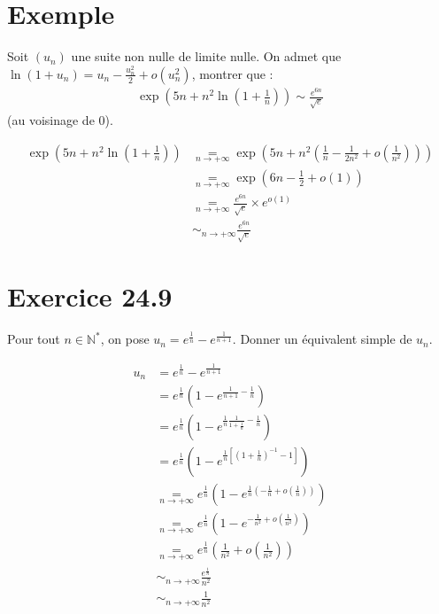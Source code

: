 \documentclass[../main.tex]{subfiles}
\begin{document}
\section{Exemple}
\begin{tcolorbox}[title=Exemple 24.46, title filled=false, colframe=darkgreen, colback=darkgreen!10!white]
    Soit $(u_n)$ une suite non nulle de limite nulle. On admet que $\ln (1 + u_n) = u_n - \frac{u_n^2}{2} + o(u_n^2)$, montrer que : 
    \begin{align*}
        \exp \left(5n + n^2\ln \left(1 + \frac{1}{n}\right)\right) \sim \frac{e^{6n}}{\sqrt{e}}
    \end{align*}
    (au voisinage de $0$).
\end{tcolorbox}

\begin{align*}
    \exp \left(5n + n^2 \ln \left(1 + \frac{1}{n}\right)\right) &\underset{n\to +\infty}{=} \exp \left(5n + n^2 \left(\frac{1}{n} - \frac{1}{2n^2} + o\left(\frac{1}{n^2}\right)\right)\right) \\
    &\underset{n\to +\infty}{=} \exp \left(6n - \frac{1}{2} + o(1)\right) \\
    &\underset{n\to +\infty}{=} \frac{e^{6n}}{\sqrt{e}} \times e^{o(1)} \\
    &\sim_{n\to +\infty} \frac{e^{6n}}{\sqrt{e}}
\end{align*}

\section*{Exercice 24.9}
\begin{tcolorbox}[title=Exercice 24.9, title filled=false, colframe=darkgreen, colback=darkgreen!10!white]
    Pour tout $n\in \mathbb{N}^*$, on pose $u_n = e^{\frac{1}{n}} - e^{\frac{1}{n+1}}$. Donner un équivalent simple de $u_n$. 
\end{tcolorbox}

\begin{align*}
    u_n &= e^{\frac{1}{n}} - e^{\frac{1}{n+1}} \\
    &= e^{\frac{1}{n}} (1 - e^{\frac{1}{n+1} -\frac{1}{n}}) \\
    &= e^{\frac{1}{n}} (1 - e^{\frac{1}{n} \frac{1}{1 + \frac{1}{n}} - \frac{1}{n}}) \\
    &= e^{\frac{1}{n}} (1 - e^{\frac{1}{n}\left[ (1 + \frac{1}{n})^{-1} - 1 \right]}) \\
    &\underset{n\to +\infty}{=} e^{\frac{1}{n}} (1 - e^{\frac{1}{n} \left(-\frac{1}{n} + o\left(\frac{1}{n}\right)\right)}) \\
    &\underset{n\to +\infty}{=} e^{\frac{1}{n}}(1 - e^{-\frac{1}{n^2} + o \left(\frac{1}{n^2}\right)}) \\
    &\underset{n\to +\infty}{=} e^{\frac{1}{n}}(\frac{1}{n^2} + o \left(\frac{1}{n^2}\right)) \\
    &\sim_{n\to +\infty} \frac{e^{\frac{1}{n}}}{n^2} \\
    &\sim_{n\to +\infty} \frac{1}{n^2}
\end{align*}
\end{document}
